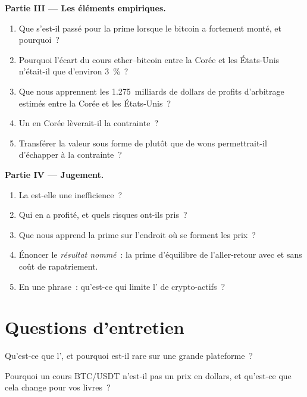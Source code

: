 \begin{problem}
\medskip\noindent\textbf{Partie III --- Les éléments empiriques.}
\begin{enumerate}[resume]
\item Que s'est-il passé pour la prime lorsque le bitcoin a fortement monté, et pourquoi~?
\item Pourquoi l'écart du cours ether--bitcoin entre la Corée et les États-Unis n'était-il que d'environ 3~\%~?
\item Que nous apprennent les 1.275~milliards de dollars de profits d'arbitrage estimés entre la Corée et les États-Unis~?
\item Un  en Corée lèverait-il la contrainte~?
\item Transférer la valeur sous forme de  plutôt que de wons permettrait-il d'échapper à la contrainte~?
\end{enumerate}

\medskip\noindent\textbf{Partie IV --- Jugement.}
\begin{enumerate}[resume]
\item La  est-elle une inefficience~?
\item Qui en a profité, et quels risques ont-ils pris~?
\item Que nous apprend la prime sur l'endroit où se forment les prix~?
\item Énoncer le \emph{résultat nommé}~: la prime d'équilibre de l'aller-retour avec et sans coût de
rapatriement.
\item En une phrase~: qu'est-ce qui limite l' de crypto-actifs~?
\end{enumerate}
\end{problem}

\section{Questions d'entretien}

\begin{interviewq}\label{iq:m3:spot-markets:1}
Qu'est-ce que l', et pourquoi est-il rare sur une grande plateforme~?
\end{interviewq}

\begin{interviewq}\label{iq:m3:spot-markets:2}
Pourquoi un cours BTC/USDT n'est-il pas un prix en dollars, et qu'est-ce que cela change pour vos livres~?
\end{interviewq}

